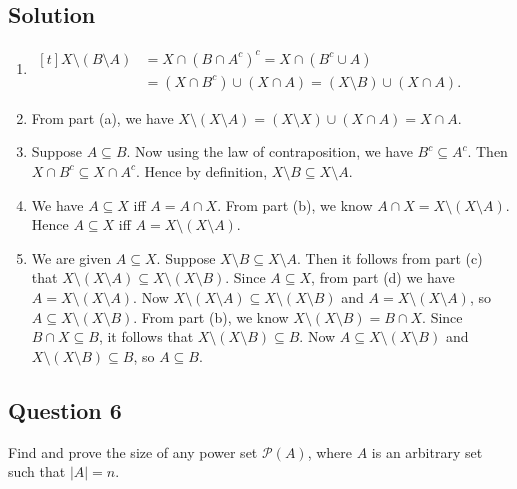 \documentclass{article}
\begin{document}
\subsection*{Solution}
    \begin{enumerate}
        \item \hfill
        $\begin{aligned}[t]
            X \setminus (B \setminus A) &= X \cap (B \cap A^c)^c = X \cap (B^c \cup A) \\
            &= (X \cap B^c) \cup (X \cap A) = (X \setminus B) \cup (X \cap A).
        \end{aligned}$ \hfill\null
        \item From part (a), we have $X \setminus (X \setminus A) = (X \setminus X) \cup (X \cap A) = X \cap A$. 
        \item Suppose $A \subseteq B$. Now using the law of contraposition, we have $B^c \subseteq A^c$. Then $X \cap B^c \subseteq X \cap A^c$. Hence by definition, $X \setminus B \subseteq X \setminus A$.
        \item We have $A \subseteq X$ iff $A = A \cap X$. From part (b), we know $A \cap X = X \setminus (X \setminus A).$ Hence $A \subseteq X$ iff $A = X \setminus (X \setminus A)$.
        \item We are given $A \subseteq X$. Suppose $X \setminus B \subseteq X \setminus A$. Then it follows from part (c) that $X \setminus (X \setminus A) \subseteq X \setminus (X \setminus B)$. Since $A \subseteq X$, from part (d) we have $A = X \setminus (X \setminus A)$. Now $X \setminus (X \setminus A) \subseteq X \setminus (X \setminus B)$ and $A = X \setminus (X \setminus A)$, so $A \subseteq X \setminus (X \setminus B)$. From part (b), we know $X \setminus (X \setminus B) = B \cap X$. Since $B \cap X \subseteq B$, it follows that $X \setminus (X \setminus B) \subseteq B$. Now $A \subseteq X \setminus (X \setminus B)$ and $X \setminus (X \setminus B) \subseteq B$, so $A \subseteq B$.
    \end{enumerate}

\subsection*{Question 6}
    Find and prove the size of any power set $\mathcal{P}(A)$, where $A$ is an arbitrary set such that $|A| = n$. 
    
\end{document}
